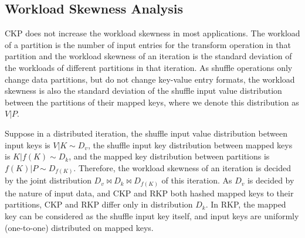 \documentclass[10pt,journal,compsoc]{IEEEtran}
\begin{document}
\subsection{Workload Skewness Analysis}\label{section:skew}
CKP does not increase the workload skewness in most applications. 
The workload of a partition is the number of input entries for the transform operation in that partition and 
the workload skewness of an iteration is the standard deviation of the workloads of different partitions in that iteration. 
As shuffle operations only change data partitions, but do not change 
key-value entry formats, the workload skewness is also the standard deviation of 
the shuffle input value distribution between the partitions of their mapped keys, 
where we denote this distribution as $V|P$. 



Suppose in a distributed iteration, the shuffle input value distribution
between input keys is $V|K \sim D_{v}$, the shuffle input key distribution 
between mapped keys is $K|f(K) \sim D_{k}$, and the mapped key distribution 
between partitions is $f(K)|P \sim D_{f(K)}$. 
Therefore, the workload skewness of an iteration is decided by 
the joint distribution $D_{v} \bowtie D_{k} \bowtie D_{f(K)}$ of this iteration.
As $D_{v}$ is decided by the nature of input data, 
and CKP and RKP both hashed mapped keys to their partitions, 
CKP and RKP differ only in distribution $D_{k}$. 
In RKP, the mapped key can be considered as the shuffle input key itself, 
and input keys are uniformly (one-to-one) distributed on mapped keys. 



\end{document}
